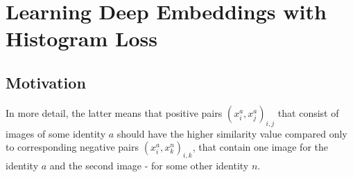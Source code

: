 \newcommand{\histroot}{Chapters/histloss}

\chapter{Learning Deep Embeddings with Histogram Loss}
\label{chapt:hist}
 


\section{Motivation}




In more detail, the latter means that positive pairs ${(x_i^a, x_j^a)}_{i,j}$ that consist of images of some identity $a$ should have the higher similarity value compared only to corresponding negative pairs ${(x_i^a, x_k^{n})}_{i,k}$, that contain one image for the identity $a$ and the second image - for some other identity $n$. 

